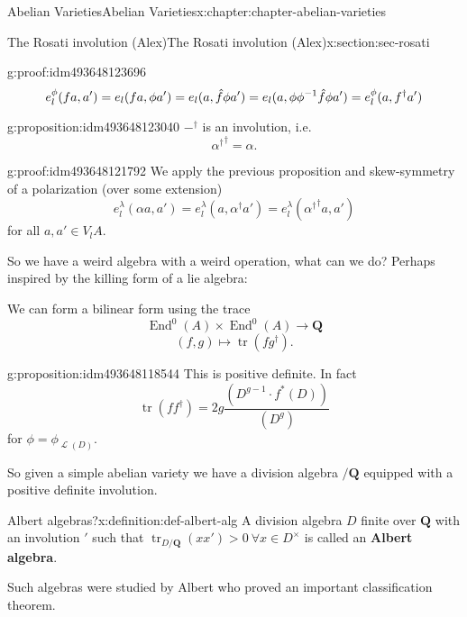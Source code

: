 \documentclass[oneside,10pt,]{book}
\newcommand{\terminology}[1]{\textbf{#1}}
\newcommand{\qedhere}{\relax}
\numberwithin{equation}{section}
\newcommand{\sheaf}[1]{\operatorname{\mathcal{#1}}}
\newcommand{\inv}{^{-1}}
\newcommand{\QQ}{\mathbf{Q}}
\DeclareMathOperator{\End}{End}
\DeclareMathOperator{\tr}{tr}
\begin{document}
\begin{chapterptx}{Abelian Varieties}{}{Abelian Varieties}{}{}{x:chapter:chapter-abelian-varieties}
\begin{sectionptx}{The Rosati involution (Alex)}{}{The Rosati involution (Alex)}{}{}{x:section:sec-rosati}
\begin{proofptx}{}{g:proof:idm493648123696}
%
\begin{equation*}
e_l^\phi(f a ,a')  = e_l(fa, \phi a')= e_l(a, \hat f \phi a') = e_l(a, \phi\phi\inv \hat f \phi a') =  e_l^\phi(a, f^\dagger a')\qedhere
\end{equation*}
%
\end{proofptx}
\begin{proposition}{}{}{g:proposition:idm493648123040}%
\(-^\dagger\) is an involution, i.e.%
\begin{equation*}
{\alpha^\dagger}^{\dagger} = \alpha\text{.}
\end{equation*}
%
\end{proposition}
\begin{proofptx}{}{g:proof:idm493648121792}
We apply the previous proposition and skew-symmetry of a polarization (over some extension)%
\begin{equation*}
e_l^\lambda(\alpha a,a') = e_l^\lambda(a, \alpha^\dagger a') = e_l^\lambda({\alpha^\dagger}^{\dagger} a, a')
\end{equation*}
for all \(a,a'\in V_l A\).%
\end{proofptx}
So we have a weird algebra with a weird operation, what can we do? Perhaps inspired by the killing form of a lie algebra:%
\par
We can form a bilinear form using the trace%
\begin{equation*}
\End^0(A) \times \End^0(A) \to \QQ
\end{equation*}
%
\begin{equation*}
(f,g) \mapsto \tr(fg^\dagger)\text{.}
\end{equation*}
%
\begin{proposition}{}{}{g:proposition:idm493648118544}%
This is positive definite. In fact%
\begin{equation*}
\tr(ff^\dagger) = 2g\frac{(D^{g-1}\cdot f^*(D))}{(D^g)}
\end{equation*}
for \(\phi = \phi_{\sheaf L(D)}\).%
\end{proposition}
So given a simple abelian variety we have a division algebra  \(/ \QQ\) equipped with  a positive definite involution.%
\begin{definition}{Albert algebras?}{x:definition:def-albert-alg}%
A division algebra \(D\) finite over \(\QQ\) with an involution \('\) such that \(\tr_{D/\QQ}(xx') > 0\ \forall x\in D^\times\) is called an \terminology{Albert algebra}.%
\end{definition}
Such algebras were studied by Albert who proved an important classification theorem.%

\end{sectionptx}
\end{chapterptx}
\end{document}
